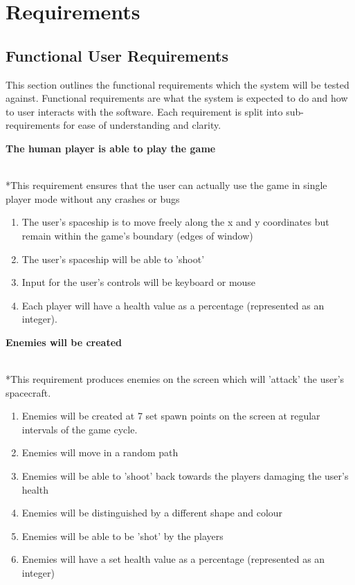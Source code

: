 \chapter{Requirements}
\label{cha:requirements}
\section{Functional User Requirements}
\label{sec: functional}

This section outlines the functional requirements which the system will be tested against. Functional requirements are what the system is expected to do and how to user interacts with the software. Each requirement is split into sub-requirements for ease of understanding and clarity.

\begin{enumerate}

\large{ \item \textbf{The human player is able to play the game}}
\\*This requirement ensures that the user can actually use the game in single player mode without any crashes or bugs

\begin {enumerate}
\item The user's spaceship is to move freely along the x and y coordinates but remain within the game's boundary (edges of window)
\item The user's spaceship will be able to 'shoot' 
\item Input for the user's controls will be keyboard or mouse
\item Each player will have a health value as a percentage (represented as an integer).
\end{enumerate}

\large{ \item \textbf{Enemies will be created}}
\\*This requirement produces enemies on the screen which will 'attack' the user's spacecraft.

\begin{enumerate}
\item Enemies will be created at 7 set spawn points on the screen at regular intervals of the game cycle.
\item Enemies will move in a random path
\item Enemies will be able to 'shoot' back towards the players damaging the user's health
\item Enemies will be distinguished by a different shape and colour
\item Enemies will be able to be 'shot' by the players
\item Enemies will have a set health value as a percentage (represented as an integer)
\end{enumerate}


\end{enumerate}
